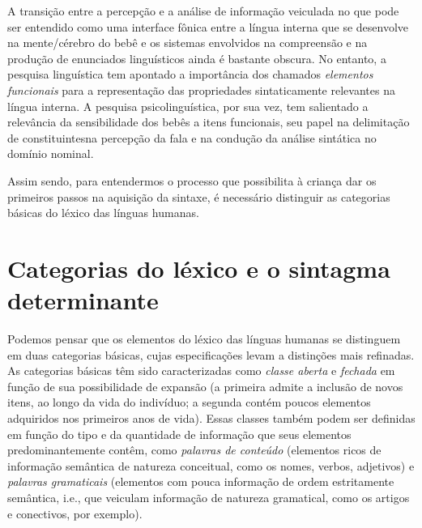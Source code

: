 \documentclass[output=paper]{LSP/langsci}
\begin{document}
A transição entre a percepção e a análise de informação veiculada no que pode ser entendido como uma interface fônica entre a língua interna que se desenvolve na mente/cérebro do bebê e os sistemas envolvidos na compreensão e na produção de enunciados linguísticos ainda é bastante obscura. No entanto, a pesquisa linguística tem apontado a importância dos chamados \textit{elementos funcionais} para a representação das propriedades sintaticamente relevantes na língua interna. A pesquisa psicolinguística, por sua vez, tem salientado a relevância da sensibilidade dos bebês a itens funcionais, seu papel na delimitação de constituintes\largerpage na percepção da fala e na condução da análise sintática no domínio nominal. 

Assim sendo, para entendermos o processo que possibilita à criança dar os primeiros passos na aquisição da sintaxe, é necessário distinguir as categorias básicas do léxico das línguas humanas.  

\section{Categorias do léxico e o sintagma determinante}
Podemos pensar que os elementos do léxico das línguas humanas se distinguem em duas categorias básicas, cujas especificações levam a distinções mais refinadas. As categorias básicas têm sido caracterizadas como \textit{classe aberta} e \textit{fechada} em função de sua possibilidade de expansão (a primeira admite a inclusão de novos itens, ao longo da vida do indivíduo; a segunda contém poucos elementos adquiridos nos primeiros anos de vida). Essas classes também podem ser definidas em função do tipo e da quantidade de informação que seus elementos predominantemente contêm, como \textit{palavras de conteúdo} (elementos ricos de informação semântica de natureza conceitual, como os nomes, verbos, adjetivos) e \textit{palavras gramaticais} (elementos com pouca informação de ordem estritamente semântica, i.e., que veiculam informação de natureza gramatical, como os artigos e conectivos, por exemplo). 
\end{document}
